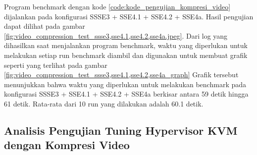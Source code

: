 Program benchmark dengan kode \ref{code:kode_pengujian_kompresi_video} dijalankan pada konfigurasi SSSE3 + SSE4.1 + SSE4.2 + SSE4a. Hasil pengujian dapat dilihat pada gambar \ref{fig:video_compression_test_ssse3,sse4.1,sse4.2,sse4a.jpeg}. Dari log yang dihasilkan saat menjalankan program benchmark, waktu yang diperlukan untuk melakukan setiap run benchmark diambil dan digunakan untuk membuat grafik seperti yang terlihat pada gambar \ref{fig:video_compression_test_ssse3,sse4.1,sse4.2,sse4a_graph} Grafik tersebut menunjukkan bahwa waktu yang diperlukan untuk melakukan benchmark pada konfigurasi SSSE3 + SSE4.1 + SSE4.2 + SSE4a berkisar antara 59 detik hingga 61 detik. Rata-rata dari 10 run yang dilakukan adalah 60.1 detik.

\subsection{Analisis Pengujian Tuning Hypervisor KVM dengan Kompresi Video}


